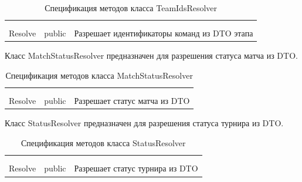 \begin{xltabular}{\textwidth}{|X|X|X|}
	\caption{Спецификация методов класса TeamIdsResolver}\label{table:TeamIdsResolverMethods}\\ \hline
	 &  &  \\ \hline
	 &  &  \\ \hline
	\endfirsthead
	 \hline
	 &  &  \\ \hline
	\endhead
	Resolve & public & Разрешает идентификаторы команд из DTO этапа \\ \hline
\end{xltabular}

Класс MatchStatusResolver предназначен для разрешения статуса матча из DTO.

\begin{xltabular}{\textwidth}{|X|X|X|}
	\caption{Спецификация методов класса MatchStatusResolver}\label{table:MatchStatusResolverMethods}\\ \hline
	 &  &  \\ \hline
	 &  &  \\ \hline
	\endfirsthead
	 \hline
	 &  &  \\ \hline
	\endhead
	Resolve & public & Разрешает статус матча из DTO \\ \hline
\end{xltabular}

Класс StatusResolver предназначен для разрешения статуса турнира из DTO.

\begin{xltabular}{\textwidth}{|X|X|X|}
	\caption{Спецификация методов класса StatusResolver}\label{table:StatusResolverMethods}\\ \hline
	 &  &  \\ \hline
	 &  &  \\ \hline
	\endfirsthead
	 \hline
	 &  &  \\ \hline
	\endhead
	Resolve & public & Разрешает статус турнира из DTO \\ \hline
\end{xltabular}

